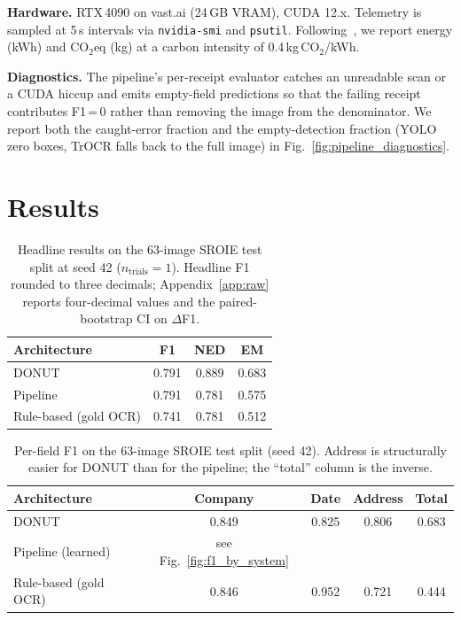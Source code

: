 \documentclass[conference]{IEEEtran}
\begin{document}
\textbf{Hardware.}  RTX\,4090 on vast.ai (24\,GB VRAM), CUDA 12.x.
Telemetry is sampled at 5\,s intervals via \texttt{nvidia-smi} and
\texttt{psutil}.  Following~\cite{strubell2019energy}, we report
energy (kWh) and CO$_2$eq (kg) at a carbon intensity of
0.4\,kg\,CO$_2$/kWh.

\textbf{Diagnostics.}  The pipeline's per-receipt evaluator catches
an unreadable scan or a CUDA hiccup and emits empty-field
predictions so that the failing receipt contributes F1\,=\,0 rather
than removing the image from the denominator.  We report both the
caught-error fraction and the empty-detection fraction (YOLO zero
boxes, TrOCR falls back to the full image) in
Fig.~\ref{fig:pipeline_diagnostics}.


\section{Results}
\label{sec:results}

\begin{table}[!t]
\centering
\caption{Headline results on the 63-image SROIE test split at seed 42
         ($n_{\text{trials}}=1$).  Headline F1 rounded to three
         decimals; Appendix~\ref{app:raw} reports four-decimal values
         and the paired-bootstrap CI on $\Delta$F1.}
\label{tab:headline}
\begin{tabular}{lccc}
\toprule
Architecture & F1 & NED & EM \\ \midrule
DONUT                  & 0.791 & 0.889 & 0.683 \\
Pipeline               & 0.791 & 0.781 & 0.575 \\
Rule-based (gold OCR)  & 0.741 & 0.781 & 0.512 \\
\bottomrule
\end{tabular}
\end{table}

\begin{table}[!t]
\centering
\caption{Per-field F1 on the 63-image SROIE test split (seed 42).
         Address is structurally easier for DONUT than for the
         pipeline; the ``total'' column is the inverse.}
\label{tab:perfield}
\begin{tabular}{lcccc}
\toprule
Architecture & Company & Date & Address & Total \\ \midrule
DONUT                 & 0.849 & 0.825 & 0.806 & 0.683 \\
Pipeline (learned)    & see Fig.~\ref{fig:f1_by_system} & & & \\
Rule-based (gold OCR) & 0.846 & 0.952 & 0.721 & 0.444 \\
\bottomrule
\end{tabular}
\end{table}
\end{document}
